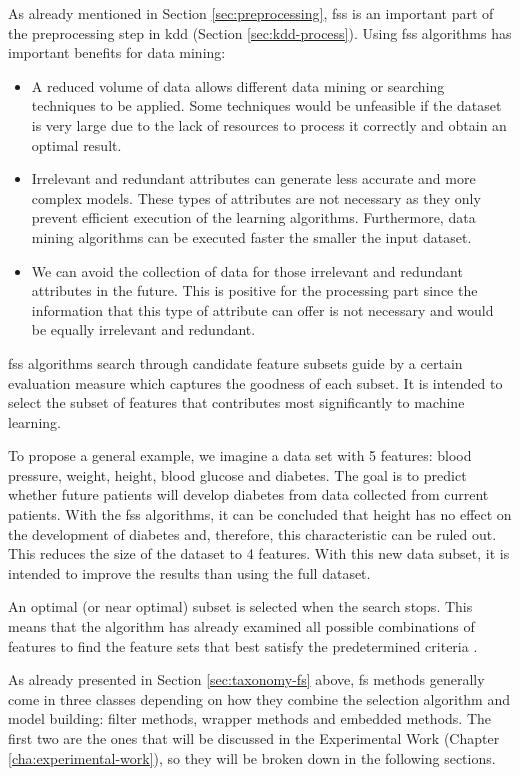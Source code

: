 As already mentioned in Section \ref{sec:preprocessing}, \acrshort{fss} is an important part of the preprocessing step in \acrfull{kdd} (Section \ref{sec:kdd-process}). Using \acrshort{fss} algorithms has important benefits for data mining:
\begin{itemize}
    \item A reduced volume of data allows different data mining or searching techniques to be applied. Some techniques would be unfeasible if the dataset is very large due to the lack of resources to process it correctly and obtain an optimal result.

    \item Irrelevant and redundant attributes can generate less accurate and more complex models. These types of attributes are not necessary as they only prevent efficient execution of the learning algorithms. Furthermore, data mining algorithms can be executed faster the smaller the input dataset.

    \item We can avoid the collection of data for those irrelevant and  redundant attributes in the future. This is positive for the processing part since the information that this type of attribute can offer is not necessary and would be equally irrelevant and redundant.
\end{itemize}

\acrshort{fss} algorithms search through candidate feature subsets guide by a certain evaluation measure which captures the goodness of each subset. It is intended to select the subset of features that contributes most significantly to machine learning.

To propose a general example, we imagine a data set with 5 features: blood pressure, weight, height, blood glucose and diabetes. The goal is to predict whether future patients will develop diabetes from data collected from current patients. With the \acrshort{fss} algorithms, it can be concluded that height has no effect on the development of diabetes and, therefore, this characteristic can be ruled out. This reduces the size of the dataset to 4 features. With this new data subset, it is intended to improve the results than using the full dataset.

An optimal (or near optimal) subset is selected when the search stops. This means that the algorithm has already examined all possible combinations of features to find the feature sets that best satisfy the predetermined criteria \cite{optimal}.

As already presented in Section \ref{sec:taxonomy-fs} above, \acrlong{fs} methods generally come in three classes depending on how they combine the selection algorithm and model building: filter methods, wrapper methods and embedded methods. The first two are the ones that will be discussed in the Experimental Work (Chapter \ref{cha:experimental-work}), so they will be broken down in the following sections.

